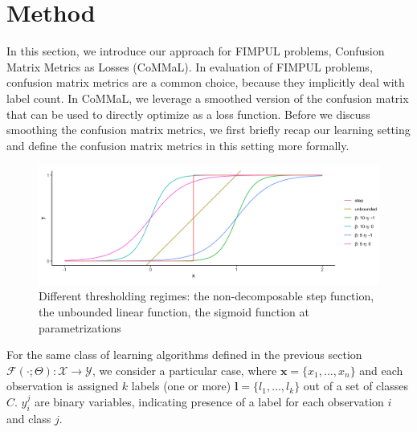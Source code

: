 
\section{Method}
\label{sec:orga8a42f5}
\label{section:method}

In this section, we introduce our approach for FIMPUL problems, Confusion Matrix Metrics as Losses (CoMMaL). In evaluation of FIMPUL problems, confusion matrix metrics are a common choice, because they implicitly deal with label count. In CoMMaL, we leverage a smoothed version of the confusion matrix that can be used to directly optimize as a loss function. Before we discuss smoothing the confusion matrix metrics, we first briefly recap our learning setting and define the confusion matrix metrics in this setting more formally.

\begin{figure}[htbp]
\centering
\includegraphics[width=.9\linewidth]{./images/sigmoid.png}
\caption{\label{fig:sigmoid}
Different thresholding regimes: the non-decomposable step function, the unbounded linear function, the sigmoid function at parametrizations}
\end{figure}

For the same class of learning algorithms defined in the previous section \(\mathcal{F}(\cdot ; \Theta): \mathcal{X} \rightarrow \mathcal{Y}\), we consider a particular case, where \(\mathbf{x} = \{x_1, \ldots, x_n\}\) and each observation is assigned $k$ labels (one or more) \(\mathbf{l} = \{l_1, \ldots, l_k\}\) out of a set of classes $C$. \(y_{i}^{j}\) are binary variables, indicating presence of a label for each observation \(i\) and class \(j\).




